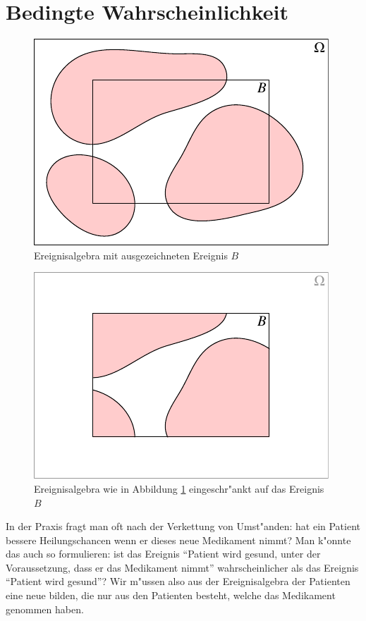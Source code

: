 \section{Bedingte Wahrscheinlichkeit}
\begin{figure}
\begin{center}
\includegraphics{images/algebra-1}
\end{center}
\caption{Ereignisalgebra mit ausgezeichneten Ereignis $B$\label{bedingt1}}
\end{figure}
\begin{figure}
\begin{center}
\includegraphics{images/algebra-2}
\end{center}
\caption{Ereignisalgebra wie in Abbildung \ref{bedingt1} eingeschr"ankt auf das Ereignis $B$\label{bedingt2}}
\end{figure}
In der Praxis fragt man oft nach der Verkettung von Umst"anden: hat ein
Patient bessere Heilungschancen wenn er dieses neue Medikament nimmt?
Man k"onnte das auch so formulieren: ist das Ereignis
``Patient wird gesund, unter der Voraussetzung, dass er das Medikament nimmt''
wahrscheinlicher als das Ereignis ``Patient wird gesund''? Wir m"ussen
also aus der Ereignis\-algebra der Patienten eine neue bilden, die nur
aus den Patienten besteht, welche das Medikament genommen haben.

